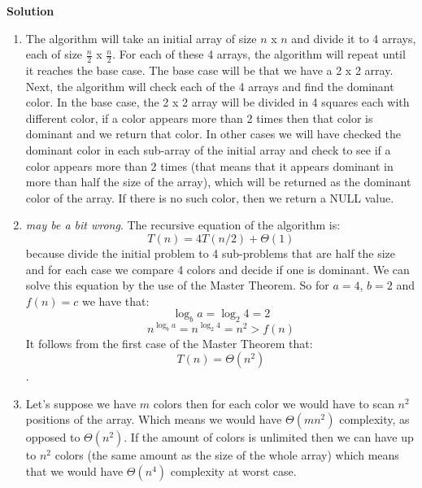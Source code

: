 \documentclass[12pt]{article}
\begin{document}
\begin{center}
\textbf{Solution}
\end{center}
\begin{enumerate}
\item The algorithm will take an initial array of size $n$ x $n$ and divide it to 4 arrays, each of size $\frac{n}{2}$ x $\frac{n}{2}$. For each of these 4 arrays, the algorithm will repeat until it reaches the base case. The base case will be that we have a 2 x 2 array. Next, the algorithm will check each of the 4 arrays and find the dominant color. In the base case, the 2 x 2 array will be divided in 4 squares each with different color, if a color appears more than 2 times then that color is dominant and we return that color. In other cases we will have checked the dominant color in each sub-array of the initial array and check to see if a color appears more than 2 times (that means that it appears dominant in more than half the size of the array), which will be returned as the dominant color of the array. If there is no such color, then we return a NULL value.

\item  \textit{may be a bit wrong}. The recursive equation of the algorithm is: $$T(n) = 4T(n/2) + \Theta(1)$$ because divide the initial problem to 4 sub-problems that are half the size and for each case we compare 4 colors and decide if one is dominant. We can solve this equation by the use of the Master Theorem. So for $a = 4$, $b = 2$ and $f(n) = c$ we have that: $$ \log_b a = \log_2 4 = 2$$ $$n^{\log_b a} = n^{\log_2 4} = n^2 > f(n)$$ It follows from the first case of the Master Theorem that: $$T(n) = \Theta(n^2)$$.

\item Let's suppose we have $m$ colors then for each color we would have to scan $n^2$ positions of the array. Which means we would have $\Theta(mn^2)$ complexity, as opposed to $\Theta(n^2)$. If the amount of colors is unlimited then we can have up to $n^2$ colors (the same amount as the size of the whole array) which means that we would have $\Theta(n^4)$ complexity at worst case.
\end{enumerate}
\end{document}
